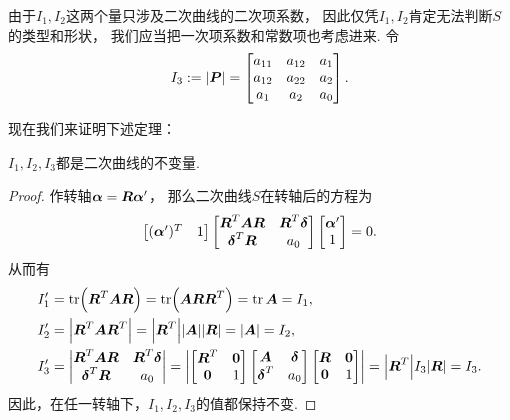 由于\(I_1,I_2\)这两个量只涉及二次曲线的二次项系数，
因此仅凭\(I_1,I_2\)肯定无法判断\(S\)的类型和形状，
我们应当把一次项系数和常数项也考虑进来.
令\begin{equation*}
	I_3 := \abs{\boldsymbol{P}}
	= \begin{bmatrix}
		a_{11} & a_{12} & a_1 \\
		a_{12} & a_{22} & a_2 \\
		a_1 & a_2 & a_0
	\end{bmatrix}.
\end{equation*}

现在我们来证明下述定理：
\begin{theorem}
\(I_1,I_2,I_3\)都是二次曲线的不变量.
\begin{proof}
作转轴\(\boldsymbol\alpha = \boldsymbol{R} \boldsymbol\alpha'\)，
那么二次曲线\(S\)在转轴后的方程为\begin{equation*}
	\begin{bmatrix}
		(\boldsymbol\alpha')^T & 1
	\end{bmatrix}
	\begin{bmatrix}
		\boldsymbol{R}^T \boldsymbol{A} \boldsymbol{R} & \boldsymbol{R}^T \boldsymbol\delta \\
		\boldsymbol\delta^T \boldsymbol{R} & a_0
	\end{bmatrix}
	\begin{bmatrix}
		\boldsymbol\alpha' \\ 1
	\end{bmatrix}
	= 0.
\end{equation*}
从而有\begin{align*}
	I_1'
	&= \tr(\boldsymbol{R}^T \boldsymbol{A} \boldsymbol{R})
	= \tr(\boldsymbol{A} \boldsymbol{R} \boldsymbol{R}^T)
	= \tr\boldsymbol{A}
	= I_1, \\
	I_2'
	&= \abs{\boldsymbol{R}^T \boldsymbol{A} \boldsymbol{R}^T}
	= \abs{\boldsymbol{R}^T} \abs{\boldsymbol{A}} \abs{\boldsymbol{R}}
	= \abs{\boldsymbol{A}}
	= I_2, \\
	I_3'
	&= \begin{vmatrix}
		\boldsymbol{R}^T \boldsymbol{A} \boldsymbol{R} & \boldsymbol{R}^T \boldsymbol\delta \\
		\boldsymbol\delta^T \boldsymbol{R} & a_0
	\end{vmatrix}
	= \abs{
		\begin{bmatrix}
			\boldsymbol{R}^T & \boldsymbol0 \\
			\boldsymbol0 & 1
		\end{bmatrix}
		\begin{bmatrix}
			\boldsymbol{A} & \boldsymbol\delta \\
			\boldsymbol\delta^T & a_0
		\end{bmatrix}
		\begin{bmatrix}
			\boldsymbol{R} & \boldsymbol0 \\
			\boldsymbol0 & 1
		\end{bmatrix}
	}
	= \abs{\boldsymbol{R}^T} I_3 \abs{\boldsymbol{R}}
	= I_3.
\end{align*}
因此，在任一转轴下，\(I_1,I_2,I_3\)的值都保持不变.


\end{proof}
\end{theorem}

